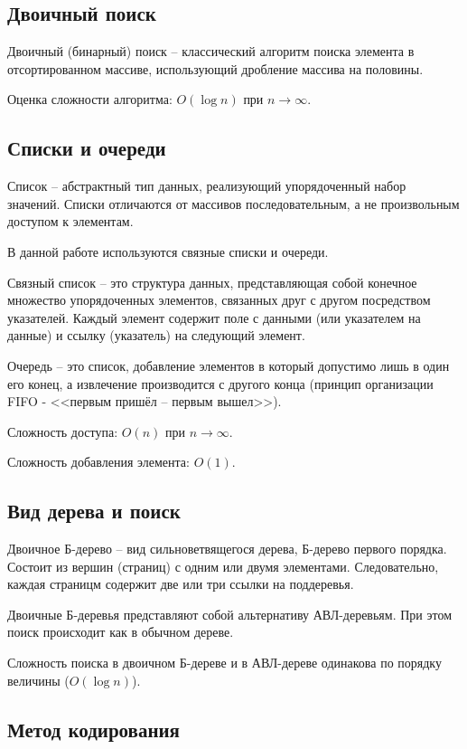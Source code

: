 \documentclass[fleqn]{article}
\begin{document}
\subsection{Двоичный поиск}

Двоичный (бинарный) поиск -- классический алгоритм поиска элемента в отсортированном
массиве, использующий дробление массива на половины.

Оценка сложности алгоритма: $O(\log n)$ при $n\to\infty$.

\subsection{Списки и очереди}

Список -- абстрактный тип данных, реализующий упорядоченный
набор значений.
Списки отличаются от массивов последовательным, а не произвольным
доступом к элементам.

В данной работе используются связные списки и очереди.

Связный список -- это структура данных, представляющая собой конечное множество
упорядоченных элементов, связанных друг с другом посредством указателей.
Каждый элемент содержит поле с данными (или указателем на данные)
и ссылку (указатель) на следующий элемент.

Очередь -- это список, добавление элементов в который допустимо лишь в один
его конец, а извлечение производится с другого конца
(принцип организации FIFO - <<первым пришёл -- первым вышел>>).

Сложность доступа: $O(n)$ при $n\to\infty$.

Сложность добавления элемента: $O(1)$.

\subsection{Вид дерева и поиск}

Двоичное Б-дерево -- вид сильноветвящегося дерева, Б-дерево первого порядка.
Состоит из вершин (страниц) с одним или двумя элементами.
Следовательно, каждая страницм содержит две или три ссылки на поддеревья.

Двоичные Б-деревья представляют собой альтернативу АВЛ-деревьям.
При этом поиск происходит как в обычном дереве.

Сложность поиска в двоичном Б-дереве и в АВЛ-дереве одинакова
по порядку величины ($O(\log n)$).

\subsection{Метод кодирования}
\end{document}
